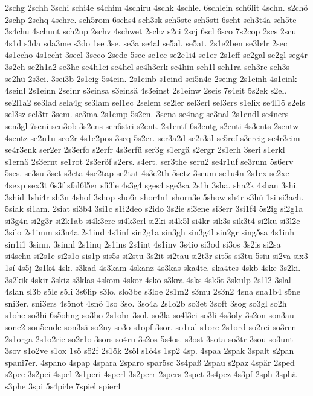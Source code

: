 {2schg
2schh
3schi
schi4e
s4chim
4schiru
4schk
4schle.
6schlein
sch6lit
4schn.
s2chö
2schp
2schq
4schre.
sch5rom
6schs4
sch3sk
sch5ste
sch5sti
6scht
sch3t4a
sch5te
3s4chu
4schunt
sch2up
2schv
4schwet
2schz
s2ci
2scj
6scl
6sco
7s2cop
2scs
2scu
4s1d
s3da
sda3me
s3do
1se
3se.
se3a
se4al
se5al.
se5at.
2s1e2ben
se3b4r
2sec
4s1echo
4s1echt
3secl
3seco
2sede
5see
se1ec
se2e1i4
se1er
2s1eff
se2gal
se2gl
seg4r
3s2eh
se2h1a2
se3he
se4h1ei
se4hel
se4h3erk
se4hin
seh1l
seh1ra
seh3re
seh3s
se2hü
2s3ei.
3sei3b
2s1eig
5s4ein.
2s1einb
s1eind
sei5n4e
2seing
2s1einh
4s1eink
4seinl
2s1einn
2seinr
s3einsa
s3einsä
4s3einst
2s1einw
2seis
7s4eit
5s2ek
s2el.
se2l1a2
se3lad
sela4g
se3lam
sel1ec
2selem
se2ler
sel3erl
sel3ers
s1elix
se4l1ö
s2els
sel3sz
sel3tr
3sem.
se3ma
2s1emp
5s2en.
3sena
se4nag
se3nal
2s1endl
se4ners
sen3gl
7seni
sen3ob
3s2ens
sen6stri
s2ent.
2s1entf
6s3entg
s2enti
4s3ents
2sentw
4sentz
se2n1u
seo2r
4s1e2pos
3seq
5s2er.
ser3a2d
se2r3al
se5ref
s3ereig
se4r3eim
se4r3enk
ser2er
2s3erfo
s2erfr
4s3erfü
ser3g
s1ergä
s2ergr
2s1erh
3seri
s1erkl
s1ernä
2s3ernt
se1rot
2s3eröf
s2ers.
s4ert.
ser3the
seru2
se4r1uf
se3rum
5s6erv
5ses.
se3su
3set
s3eta
4se2tap
se2tat
4s3e2th
5setz
3seum
se1u4n
2s1ex
se2xe
4sexp
sex3t
6s3f
sfal6l5er
sfi3le
4s3g4
sges4
sge3sa
2s1h
3sha.
sha2k
4shan
3shi.
3shid
1shi4r
sh3n
4shof
3shop
sho6r
shor4n1
shorn3e
5show
sh4r
s3hü
1si
si3ach.
5siak
si1am.
2siat
si3b4
3si1c
s1i2deo
s2ido
3s2ie
si3ene
si3err
3si1f4
5s2ig
si2g1a
si3g4n
si2g3r
si2k1ab
si4k3ere
si4k3erl
si2ki
si4k5l
si4kr
sik3s
sik3t4
si2ku
si3l2e
3silo
2s1imm
si3n4a
2s1ind
4s1inf
sin2g1a
sin3gh
sin3g4l
sin2gr
sing5sa
4s1inh
sin1i1
3sinn.
3sinnl
2s1inq
2s1ins
2s1int
4s1inv
3s4io
si3od
si3os
3s2is
si2sa
si4schu
si2s1e
si2s1o
sis1p
sis5s
si2stu
3s2it
si2tau
si2t3r
sit5s
si3tu
5siu
si2va
six3
1sí
4s5j
2s1k4
4sk.
s3kad
4s3kam
4skanz
4s3kas
ska4te.
ska4tes
4skb
4ske
3s2ki.
3s2kik
4skir
3skiz
s3klas
4skom
4skor
4skö
s3kra
4sks
4sk5t
3skulp
2s1l2
3slal
4slan
sl3b
s5le
s5li
3s6lip
s3lo.
slo3be
s3loe
2s1m2
s3mu
2s3n2
4sna
sna1b4
s5ne
sni3er.
sni3ers
4s5not
4snö
1so
3so.
3so4a
2s1o2b
so3et
3soft
3sog
so3gl
so2h
s1ohe
so3hi
6s5ohng
so3ho
2s1ohr
3sol.
so3la
so4l3ei
so3li
4s3oly
3s2on
son3au
sone2
son5ende
son3sä
so2ny
so3o
s1opf
3sor.
so1ral
s1orc
2s1ord
so2rei
so3ren
2s1orga
2s1o2rie
so2r1o
3sors
so4ru
3s2os
5s4os.
s3ost
3sota
so3tr
3sou
so3unt
3sov
s1o2ve
s1ox
1sö
sö2f
2s1ök
2söl
s1ö4s
1sp2
4sp.
4spaa
2spak
3spalt
s2pan
spani7er.
4spano
4spap
4spara
2sparo
spar5sc
3s4paß
2spau
s2paz
4spär
2sped
s2pee
3s2pei
4spel
2s1peri
4sperl
3s2perr
2spers
2spet
3s4pez
4s3pf
2sph
3sphä
s3phe
3spi
5s4pi4e
7spiel
spier4
}
